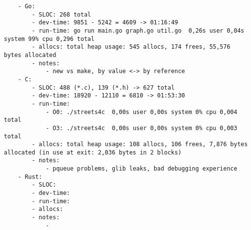 \begin{verbatim}
    - Go:
        - SLOC: 268 total
        - dev-time: 9851 - 5242 = 4609 -> 01:16:49
        - run-time: go run main.go graph.go util.go  0,26s user 0,04s system 99% cpu 0,296 total
        - allocs: total heap usage: 545 allocs, 174 frees, 55,576 bytes allocated
        - notes:
            - new vs make, by value <-> by reference
    - C:
        - SLOC: 488 (*.c), 139 (*.h) -> 627 total
        - dev-time: 18920 - 12110 = 6810 -> 01:53:30
        - run-time:
            - O0: ./streets4c  0,00s user 0,00s system 0% cpu 0,004 total
            - O3: ./streets4c  0,00s user 0,00s system 0% cpu 0,003 total
        - allocs: total heap usage: 108 allocs, 106 frees, 7,876 bytes allocated (in use at exit: 2,036 bytes in 2 blocks)
        - notes:
            - pqueue problems, glib leaks, bad debugging experience
    - Rust:
        - SLOC:
        - dev-time:
        - run-time:
        - allocs:
        - notes:
            -
\end{verbatim}
